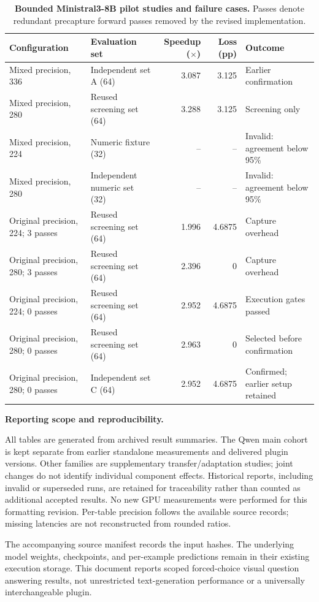 \documentclass[10pt,a4paper,landscape]{article}
\newcommand{\tnote}[1]{\par\vspace{3pt}{\footnotesize #1}\par}
\begin{document}
\clearpage
\begin{table}[!ht]\centering
\caption{\textbf{Bounded Ministral3-8B pilot studies and failure cases.} Passes denote redundant precapture forward passes removed by the revised implementation.}
\small
\begin{tabular}{@{}llrrl@{}}\toprule
Configuration & Evaluation set & Speedup ($\times$) & Loss (pp) & Outcome\\\midrule
Mixed precision, 336 & Independent set A (64) & 3.087 & 3.125 & Earlier confirmation\\
Mixed precision, 280 & Reused screening set (64) & 3.288 & 3.125 & Screening only\\
Mixed precision, 224 & Numeric fixture (32) & -- & -- & Invalid: agreement below 95\%\\
Mixed precision, 280 & Independent numeric set (32) & -- & -- & Invalid: agreement below 95\%\\
Original precision, 224; 3 passes & Reused screening set (64) & 1.996 & 4.6875 & Capture overhead\\
Original precision, 280; 3 passes & Reused screening set (64) & 2.396 & 0 & Capture overhead\\
Original precision, 224; 0 passes & Reused screening set (64) & 2.952 & 4.6875 & Execution gates passed\\
Original precision, 280; 0 passes & Reused screening set (64) & 2.963 & 0 & Selected before confirmation\\
Original precision, 280; 0 passes & Independent set C (64) & 2.952 & 4.6875 & Confirmed; earlier setup retained\\
\bottomrule\end{tabular}
\tnote{Invalid candidates have no reported speed. These pilot studies do not replace the frozen full-benchmark configuration. Independent confirmation sets differ, so their score differences do not establish statistical superiority. One error on 64 examples corresponds to 1.5625 percentage points.}
\end{table}
\vspace{8pt}
{\bfseries Reporting scope and reproducibility.}\par
All tables are generated from archived result summaries. The Qwen main cohort is kept separate from earlier standalone measurements and delivered plugin versions. Other families are supplementary transfer/adaptation studies; joint changes do not identify individual component effects. Historical reports, including invalid or superseded runs, are retained for traceability rather than counted as additional accepted results. No new GPU measurements were performed for this formatting revision. Per-table precision follows the available source records; missing latencies are not reconstructed from rounded ratios.
\par
The accompanying source manifest records the input hashes. The underlying model weights, checkpoints, and per-example predictions remain in their existing execution storage. This document reports scoped forced-choice visual question answering results, not unrestricted text-generation performance or a universally interchangeable plugin.
\end{document}
